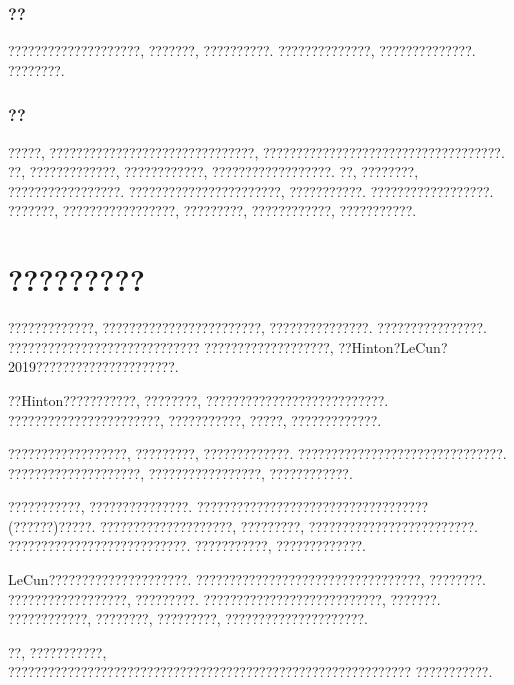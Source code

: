 \documentclass[lang=cn,11pt,a4paper]{elegantpaper}
\begin{document}
\subsubsection*{??}
????????????????????, ???????, ??????????. ??????????????, ??????????????. ????????. 
\subsubsection*{??}
?????, ???????????????????????????????, ????????????????????????????????????. ??, ?????????????, ????????????, ??????????????????. ??, ????????, ?????????????????. ???????????????????????, ???????????. ??????????????????. ???????, ?????????????????, ?????????, ????????????, ???????????. 

\section{?????????}

?????????????, ????????????????????????, ???????????????. ????????????????. ????????????????????????????? ???????????????????, ??Hinton?LeCun?2019?????????????????????.

??Hinton??\cite{Youtube}?????????, ????????, ???????????????????????????. ???????????????????????, ???????????, ?????, ?????????????. \cite{kosiorek2019stacked}

??????????????????, ?????????, ?????????????. ???????????????????????????????. ????????????????????, ?????????????????, ????????????. 

???????????, ???????????????. ???????????????????????????????????(??????)?????. ????????????????????, ?????????, ?????????????????????????. ???????????????????????????. ???????????, ?????????????.

LeCun?????????????????????. ??????????????????????????????????, ????????. ??????????????????, ?????????. ???????????????????????????, ???????. ????????????, ????????, ?????????, ?????????????????????.

??, ???????????, ????????????????????????????????????????????????????????????? ???????????.
\newpage
\appendix
{}
\end{document}
